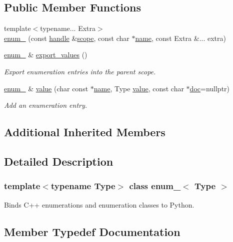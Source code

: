\subsection*{Public Member Functions}
\begin{DoxyCompactItemize}
\item 
{\footnotesize template$<$typename... Extra$>$ }\\\mbox{\hyperlink{classenum___a91101e5ded2dc0b8ef0405a7197f1cf1}{enum\+\_\+}} (const \mbox{\hyperlink{classhandle}{handle}} \&\mbox{\hyperlink{structscope}{scope}}, const char $\ast$\mbox{\hyperlink{structname}{name}}, const Extra \&... extra)
\item 
\mbox{\hyperlink{classenum__}{enum\+\_\+}} \& \mbox{\hyperlink{classenum___a1cb0d14e870b83cd87bd1f9846b9a449}{export\+\_\+values}} ()
\begin{DoxyCompactList}\small\item\em Export enumeration entries into the parent scope. \end{DoxyCompactList}\item 
\mbox{\hyperlink{classenum__}{enum\+\_\+}} \& \mbox{\hyperlink{classenum___a4fae60a7877648a70512ea627dc24b12}{value}} (char const $\ast$\mbox{\hyperlink{structname}{name}}, Type \mbox{\hyperlink{_s_d_l__opengl__glext_8h_a8ad81492d410ff2ac11f754f4042150f}{value}}, const char $\ast$\mbox{\hyperlink{structdoc}{doc}}=nullptr)
\begin{DoxyCompactList}\small\item\em Add an enumeration entry. \end{DoxyCompactList}\end{DoxyCompactItemize}
\subsection*{Additional Inherited Members}


\subsection{Detailed Description}
\subsubsection*{template$<$typename Type$>$\newline
class enum\+\_\+$<$ Type $>$}

Binds C++ enumerations and enumeration classes to Python. 

\subsection{Member Typedef Documentation}
\mbox{\label{classenum___a267908cc80a1ac648484ff98c8a49648}} 
